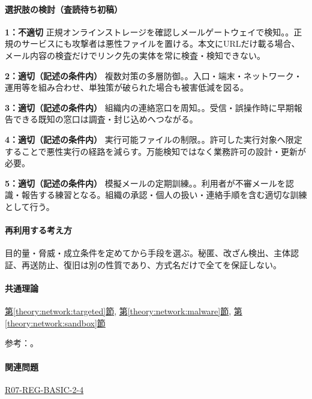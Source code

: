\paragraph{選択肢の検討（査読待ち初稿）}\mbox{}\par

\noindent\textbf{1：不適切} 正規オンラインストレージを確認しメールゲートウェイで検知。。正規のサービスにも攻撃者は悪性ファイルを置ける。本文にURLだけ載る場合、メール内容の検査だけでリンク先の実体を常に検査・検知できない。\par

\noindent\textbf{2：適切（記述の条件内）} 複数対策の多層防御。。入口・端末・ネットワーク・運用等を組み合わせ、単独策が破られた場合も被害低減を図る。\par

\noindent\textbf{3：適切（記述の条件内）} 組織内の連絡窓口を周知。。受信・誤操作時に早期報告できる既知の窓口は調査・封じ込めへつながる。\par

\noindent\textbf{4：適切（記述の条件内）} 実行可能ファイルの制限。。許可した実行対象へ限定することで悪性実行の経路を減らす。万能検知ではなく業務許可の設計・更新が必要。\par

\noindent\textbf{5：適切（記述の条件内）} 模擬メールの定期訓練。。利用者が不審メールを認識・報告する練習となる。組織の承認・個人の扱い・連絡手順を含む適切な訓練として行う。\par

\paragraph{再利用する考え方} 目的量・脅威・成立条件を定めてから手段を選ぶ。秘匿、改ざん検出、主体認証、再送防止、復旧は別の性質であり、方式名だけで全てを保証しない。

\paragraph{共通理論} \hyperref[theory:network:targeted]{第\ref*{theory:network:targeted}節}, \hyperref[theory:network:malware]{第\ref*{theory:network:malware}節}, \hyperref[theory:network:sandbox]{第\ref*{theory:network:sandbox}節}

\par 参考：\cite{net_target2020,net_target2023}。

\paragraph{関連問題} \hyperref[q:r07-reg-basic-2-4]{R07-REG-BASIC-2-4}

